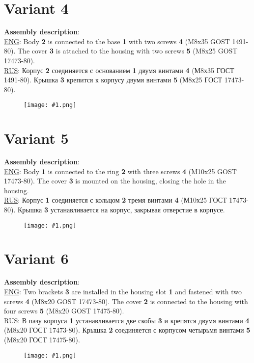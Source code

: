 \documentclass{article}
\newcommand\ttask[3] 
 {
	\section*{Variant #1}
	\textbf{Assembly description}: \\
	\underline{ENG}: #2 \smallskip \\ 
	\underline{RUS}: #3
	\begin{figure}[H]
		\centering\texttt{[image: \#1.png]}
		\label{fig:#1.png}
	\end{figure}
	\newpage
 }
\begin{document}
	\ttask{4}{Body \textbf{2} is connected to the base \textbf{1} with two screws \textbf{4} (M8x35 GOST 1491-80). The cover \textbf{3} is attached to the housing with two screws \textbf{5} (M8x25 GOST 17473-80).}{Корпус \textbf{2} соединяется с основанием \textbf{1} двумя винтами \textbf{4} (М8х35 ГОСТ 1491-80). Крышка \textbf{3} крепится к корпусу двумя винтами \textbf{5} (М8х25 ГОСТ 17473-80).}

	\ttask{5}{Body \textbf{1} is connected to the ring \textbf{2} with three screws \textbf{4} (M10x25 GOST 17473-80). The cover \textbf{3} is mounted on the housing, closing the hole in the housing.}{Корпус \textbf{1} соединяется с кольцом \textbf{2} тремя винтами \textbf{4} (М10х25 ГОСТ 17473-80). Крышка \textbf{3} устанавливается на корпус, закрывая отверстие в корпусе.}

	\ttask{6}{Two brackets \textbf{3} are installed in the housing slot \textbf{1} and fastened with two screws \textbf{4} (M8x20 GOST 17473-80). The cover \textbf{2} is connected to the housing with four screws \textbf{5} (M8x20 GOST 17475-80).}{В пазу корпуса \textbf{1} устанавливается две скобы \textbf{3} и крепятся двумя винтами \textbf{4} (M8x20 ГОСТ 17473-80). Крышка \textbf{2} соединяется с корпусом четырьмя винтами \textbf{5} (M8x20 ГОСТ 17475-80).}
\end{document}
